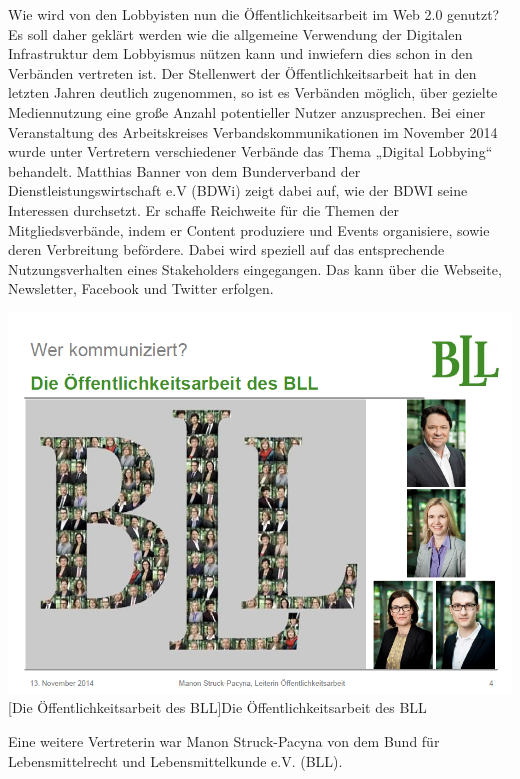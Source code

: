\documentclass[12pt,a4paper,bibliography=totocnumbered,listof=totocnumbered]{scrartcl}
\begin{document}
Wie wird von den Lobbyisten nun die Öffentlichkeitsarbeit im Web 2.0 genutzt? 
Es soll daher geklärt werden wie die allgemeine Verwendung der Digitalen Infrastruktur dem Lobbyismus nützen kann und inwiefern dies schon in den Verbänden vertreten ist.
Der Stellenwert der Öffentlichkeitsarbeit hat in den letzten Jahren deutlich zugenommen, so ist es Verbänden möglich, über gezielte Mediennutzung eine große Anzahl potentieller Nutzer anzusprechen. 
Bei einer Veranstaltung des Arbeitskreises Verbandskommunikationen im November 2014 wurde unter Vertretern verschiedener Verbände das Thema „Digital Lobbying“ behandelt. 
Matthias Banner von dem Bunderverband der Dienstleistungswirtschaft e.V (BDWi) zeigt dabei auf, wie der BDWI seine Interessen durchsetzt. Er schaffe Reichweite für die Themen der Mitgliedsverbände, indem er Content produziere und Events organisiere, sowie deren Verbreitung befördere. Dabei wird speziell auf das entsprechende Nutzungsverhalten eines Stakeholders eingegangen. Das kann über die Webseite, Newsletter, Facebook und Twitter erfolgen. \cite[vgl.]{DPRG}

\vspace{1em}
\begin{minipage}{\linewidth}
	\centering
	\includegraphics[width=1\linewidth]{Bilder/bla1.png}
	[Die Öffentlichkeitsarbeit des BLL]{Die Öffentlichkeitsarbeit des BLL\footnotemark }
	\label{fig:osgi}
\end{minipage}

Eine weitere Vertreterin war Manon Struck-Pacyna von dem Bund für Lebensmittelrecht und Lebensmittelkunde e.V. (BLL).
\end{document}
